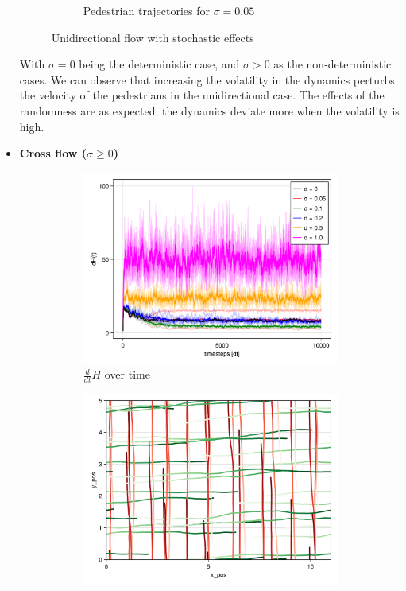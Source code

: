 \begin{itemize}
\begin{figure}[H]
\begin{subfigure}{.49\textwidth}
            \caption{Pedestrian trajectories for $\sigma = 0.05$}
            \label{plot:stoc_uni_traj}
        \end{subfigure}
        \caption{Unidirectional flow with stochastic effects}
        \label{plot:stoc_uni}
    \end{figure}
    With $\sigma = 0$ being the deterministic case, and $\sigma > 0$ as the non-deterministic cases. We can observe that increasing the volatility in the dynamics perturbs the velocity of the pedestrians in the unidirectional case. The effects of the randomness are as expected; the dynamics deviate more when the volatility is high.
    \pagebreak
    \item \textbf{Cross flow ($\sigma \geq 0$)}
    \begin{figure}[H]
        \centering
        \begin{subfigure}{.49\textwidth}
            \centering
            \includegraphics[width=\linewidth]{figures/dH_stochasic_cross_sigmaxy.png}
            \caption{$\frac{d}{dt}H$ over time}
            \label{plot:stoc_cross_dh}
        \end{subfigure}
        \begin{subfigure}{.49\textwidth}
            \centering
            \includegraphics[width=\linewidth]{figures/s0.1_crossflow_10000.png}

\end{subfigure}
\end{figure}
\end{itemize}
